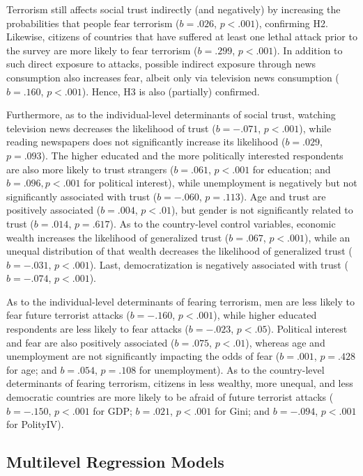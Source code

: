 Terrorism still affects social trust indirectly (and negatively) by increasing the probabilities that people fear terrorism ($b = .026$, $p < .001$), confirming H2. Likewise, citizens of countries that have suffered at least one lethal attack prior to the survey are more likely to fear terrorism ($b = .299$, $p < .001$). In addition to such direct exposure to attacks, possible indirect exposure through news consumption also increases fear, albeit only via television news consumption ($b = .160$, $p < .001$). Hence, H3 is also (partially) confirmed.


Furthermore, as to the individual-level determinants of social trust, watching television news decreases the likelihood of trust ($b = -.071$, $p < .001$), while reading newspapers does not significantly increase its likelihood ($b = .029$, $p = .093$). The higher educated and the more politically interested respondents are also more likely to trust strangers ($b = .061$, $p < .001$ for education; and $b = .096, p < .001$ for political interest), while unemployment is negatively but not significantly associated with trust ($b = -.060$, $p = .113$). Age and trust are positively associated ($b = .004$, $p < .01$), but gender is not significantly related to trust ($b = .014$, $p = .617$). As to the country-level control variables, economic wealth increases the likelihood of generalized trust ($b = .067$, $p < .001$), while an unequal distribution of that wealth decreases the likelihood of generalized trust ($b = -.031$, $p < .001$). Last, democratization is negatively associated with trust ($b = -.074$, $p < .001$).


As to the individual-level determinants of fearing terrorism, men are less likely to fear future terrorist attacks ($b = -.160$, $p < .001$), while higher educated respondents are less likely to fear attacks ($b = -.023$, $p < .05$). Political interest and fear are also positively associated ($b = .075$, $p < .01$), whereas age and unemployment are not significantly impacting the odds of fear ($b = .001$, $p = .428$ for age; and $b = .054$, $p = .108$ for unemployment). As to the country-level determinants of fearing terrorism, citizens in less wealthy, more unequal, and less democratic countries are more likely to be afraid of future terrorist attacks ($b = -.150$, $p < .001$ for GDP; $b = .021$, $p < .001$ for Gini; and $b = -.094$, $p < .001$ for PolityIV).



\subsection{Multilevel Regression Models}

